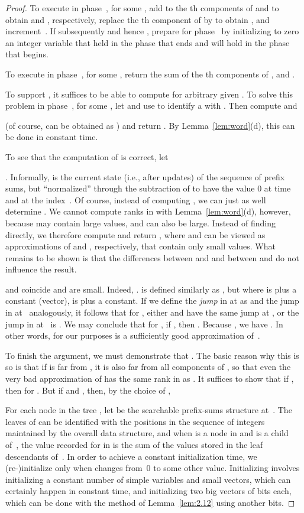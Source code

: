 \documentclass[envcountsame,envcountsect,undated,nolinenumbers]{lnthi}
\begin{document}
\begin{proof}
To execute 
in phase~, for some ,
add  to the th components of
 and  to obtain 
and , respectively,
replace the th component of
 by 
to obtain , and increment~.
If subsequently  and hence ,
prepare for phase~ by initializing to zero
an integer variable that held 
in the phase that ends and will hold
 in the phase
that begins.

To execute  in phase~, for some ,
return the sum of the th components
of ,
 and
.

To support , it suffices to be able
to compute  for arbitrary given
.
To solve this problem
in phase~, for some , let  and
use  to identify a 
with .
Then compute  and

(of course,  can be obtained as
)
and return .
By Lemma~\ref{lem:word}(d),
this can be done in constant time.

To see that the computation of
 is correct, let

.
Informally,  is the current state
(i.e., after  updates)
of the sequence  of prefix sums, but
``normalized'' through the subtraction of 
to have the value 0 at time  and at the index~.
Of course, instead of computing
, we can just as well determine
.
We cannot compute ranks in  with
Lemma~\ref{lem:word}(d), however,
because  may contain large values, and 
can also be large.
Instead of finding  directly,
we therefore compute and return ,
where  and  can be
viewed as approximations of  and ,
respectively, that contain only small values.
What remains to be shown is that the differences
between  and  and between
 and  do not influence the result.

 and  coincide and are small.
Indeed,
.
 is defined similarly as , but
where  is  plus a constant (vector),
 is  plus a constant.
If we define the \emph{jump} in  at 
as  and the jump in  at~
analogously, it follows that for ,
either  and  have the same jump
at , or the jump in  at~ is .
We may conclude that for , if
, then .
Because , we have
.
In other words, for our purposes  is
a sufficiently good approximation of~.

To finish the argument, we must demonstrate that
.
The basic reason why this is so is
that if  is far from ,
it is also far from all components of ,
so that even the very bad approximation 
of  has the same rank in  as .
It suffices to show that if , then
 for .
But if 
and , then, by the choice of ,


For each node  in the tree , let  be the
searchable prefix-sums structure at~.
The leaves of  can be identified with
the  positions in the sequence of integers
maintained by the overall data structure, and when
 is a node in  and  is a child of~,
the value recorded for  in 
is the sum  of the values stored in the leaf
descendants of~.
In order to achieve a constant initialization
time, we (re-)initialize  only when 
changes from~0 to some other value.
Initializing  involves initializing a
constant number of simple variables and
small vectors, which can certainly happen in
constant time, and initializing two big vectors
of  bits each, which can be done
with the method of
Lemma~\ref{lem:2.12} using another  bits.
\end{proof}
\end{document}

